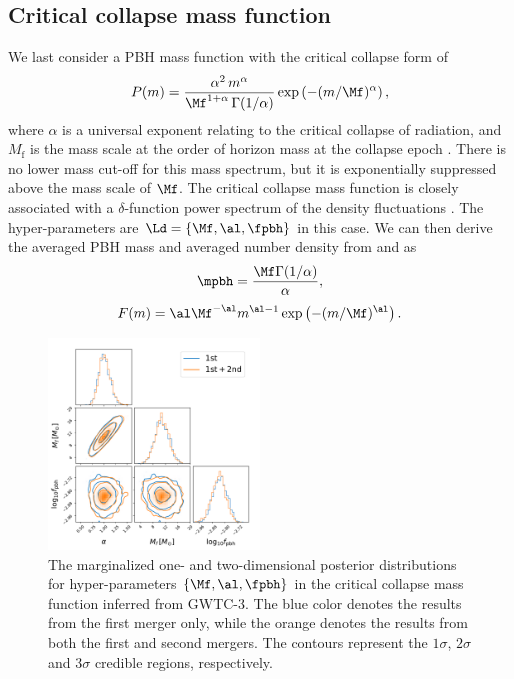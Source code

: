 \documentclass[
reprint,           %
superscriptaddress,%
amsmath,           %
amssymb,           %
aps,               %
prd,               %
notitlepage,       %
longbibliography,  %
floatfix,          %
nofootinbib,
]{revtex4-1}
\def\({\left(}
\def\){\right)}
\def\e{\begin{equation}}
\def\q{\end{equation}}
\begin{document}
\subsection{Critical collapse mass function}


We last consider a PBH mass function with the critical collapse form of \cite{Niemeyer:1997mt,Yokoyama:1998xd,Carr:2016hva,Gow:2020cou}
\e
P(m)=\frac{\alpha^2\,  m^\alpha}{\Mf^{1+\alpha}\, \Gamma(1 / \alpha)} \exp \left(-(m/\Mf)^{\alpha}\right),
\q
where $\alpha$ is a universal exponent relating to the critical collapse of radiation, and $M_{\mathrm{f}}$ is the mass scale at the order of horizon mass at the collapse epoch \cite{Carr:2016hva}. 
There is no lower mass cut-off for this mass spectrum, but it is exponentially suppressed above the mass scale of $\Mf$.
The critical collapse mass function is closely associated with a $\delta$-function power spectrum of the density fluctuations \cite{Niemeyer:1997mt,Yokoyama:1998xd,Carr:2016hva,Gow:2020cou}. 
The hyper-parameters are $\Ld = \{\Mf, \al, \fpbh\}$ in this case. 
We can then derive the averaged PBH mass and averaged number density from  and  as
\e
\mpbh = \frac{\Mf \Gamma(1 / \alpha)}{\alpha},
\q
\e 
F(m) = \al \Mf^{-\al} m^{\al -1} \exp\(-(m/\Mf)^{\al}\).
\q

\begin{figure}[tbp!]
	\centering
	\includegraphics[width=0.5\textwidth]{post-CC.pdf}
	\caption{\label{posterior-CC}The marginalized one- and two-dimensional posterior distributions for hyper-parameters $\{\Mf, \al, \fpbh\}$ in the critical collapse mass function inferred from GWTC-3. The blue color denotes the results from the first merger only, while the orange denotes the results from both the first and second mergers. The contours represent the $1\sigma$, $2\sigma$ and $3\sigma$ credible regions, respectively.}
\end{figure}
\end{document}
